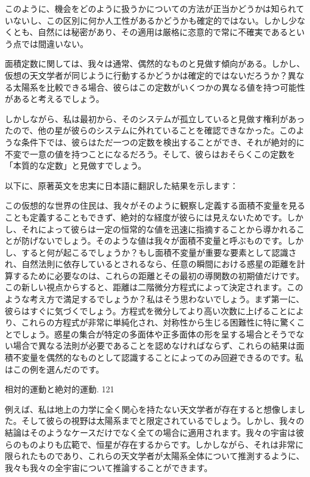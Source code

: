 \documentclass[a4paper,11pt,openany]{ltjsbook}
\begin{document}
このように、機会をどのように扱うかについての方法が正当かどうかは知られていないし、この区別に何か人工性があるかどうかも確定的ではない。しかし少なくとも、自然には秘密があり、その適用は厳格に恣意的で常に不確実であるという点では間違いない。

面積定数に関しては、我々は通常、偶然的なものと見做す傾向がある。しかし、仮想の天文学者が同じように行動するかどうかは確定的ではないだろうか？異なる太陽系を比較できる場合、彼らはこの定数がいくつかの異なる値を持つ可能性があると考えるでしょう。

しかしながら、私は最初から、そのシステムが孤立していると見做す権利があったので、他の星が彼らのシステムに外れていることを確認できなかった。このような条件下では、彼らはただ一つの定数を検出することができ、それが絶対的に不変で一意の値を持つことになるだろう。そして、彼らはおそらくこの定数を「本質的な定数」と見做すでしょう。


以下に、原著英文を忠実に日本語に翻訳した結果を示します：

この仮想的な世界の住民は、我々がそのように観察し定義する面積不変量を見ることも定義することもできず、絶対的な経度が彼らには見えないためです。しかし、それによって彼らは一定の恒常的な値を迅速に指摘することから導かれることが防げないでしょう。そのような値は我々が面積不変量と呼ぶものです。しかし、すると何が起こるでしょうか？もし面積不変量が重要な要素として認識され、自然法則に依存しているとされるなら、任意の瞬間における惑星の距離を計算するために必要なのは、これらの距離とその最初の導関数の初期値だけです。この新しい視点からすると、距離は二階微分方程式によって決定されます。このような考え方で満足するでしょうか？私はそう思わないでしょう。まず第一に、彼らはすぐに気づくでしょう。方程式を微分してより高い次数に上げることにより、これらの方程式が非常に単純化され、対称性から生じる困難性に特に驚くことでしょう。惑星の集合が特定の多面体や正多面体の形を呈する場合とそうでない場合で異なる法則が必要であることを認めなければならず、これらの結果は面積不変量を偶然的なものとして認識することによってのみ回避できるのです。私はこの例を選んだのです。

相対的運動と絶対的運動. 121

例えば、私は地上の力学に全く関心を持たない天文学者が存在すると想像しました。そして彼らの視野は太陽系までと限定されているでしょう。しかし、我々の結論はそのようなケースだけでなく全ての場合に適用されます。我々の宇宙は彼らのものよりも広範で、恒星が存在するからです。しかしながら、それは非常に限られたものであり、これらの天文学者が太陽系全体について推測するように、我々も我々の全宇宙について推論することができます。
\end{document}
